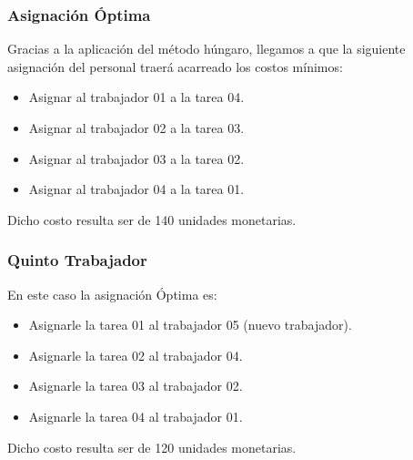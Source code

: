 
\begin{homeworkProblem}[-1][JoShop]

\subsubsection{Asignación Óptima}
Gracias a la aplicación del método húngaro, llegamos a que la siguiente asignación del personal traerá acarreado los costos mínimos:
\begin{itemize}
    \item Asignar al trabajador 01 a la tarea 04.
    \item Asignar al trabajador 02 a la tarea 03.
    \item Asignar al trabajador 03 a la tarea 02.
    \item Asignar al trabajador 04 a la tarea 01.
\end{itemize}
Dicho costo resulta ser de 140 unidades monetarias.

\subsubsection{Quinto Trabajador}
En este caso la asignación Óptima es:
\begin{itemize}
    \item Asignarle la tarea 01 al trabajador 05 (nuevo trabajador).
    \item Asignarle la tarea 02 al trabajador 04.
    \item Asignarle la tarea 03 al trabajador 02.
    \item Asignarle la tarea 04 al trabajador 01.
\end{itemize}
Dicho costo resulta ser de 120 unidades monetarias.


\end{homeworkProblem}
